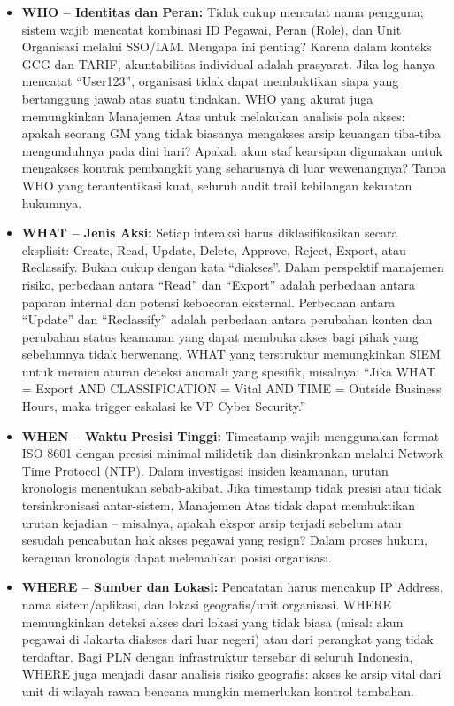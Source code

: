 \documentclass[12pt,a4paper]{report}
\begin{document}
\begin{itemize}[leftmargin=*]
    \item \textbf{WHO -- Identitas dan Peran:} Tidak cukup mencatat nama pengguna; sistem wajib mencatat kombinasi ID Pegawai, Peran (Role), dan Unit Organisasi melalui SSO/IAM. Mengapa ini penting? Karena dalam konteks GCG dan TARIF, akuntabilitas individual adalah prasyarat. Jika log hanya mencatat ``User123'', organisasi tidak dapat membuktikan siapa yang bertanggung jawab atas suatu tindakan. WHO yang akurat juga memungkinkan Manajemen Atas untuk melakukan analisis pola akses: apakah seorang GM yang tidak biasanya mengakses arsip keuangan tiba-tiba mengunduhnya pada dini hari? Apakah akun staf kearsipan digunakan untuk mengakses kontrak pembangkit yang seharusnya di luar wewenangnya? Tanpa WHO yang terautentikasi kuat, seluruh audit trail kehilangan kekuatan hukumnya.

    \item \textbf{WHAT -- Jenis Aksi:} Setiap interaksi harus diklasifikasikan secara eksplisit: Create, Read, Update, Delete, Approve, Reject, Export, atau Reclassify. Bukan cukup dengan kata ``diakses''. Dalam perspektif manajemen risiko, perbedaan antara ``Read'' dan ``Export'' adalah perbedaan antara paparan internal dan potensi kebocoran eksternal. Perbedaan antara ``Update'' dan ``Reclassify'' adalah perbedaan antara perubahan konten dan perubahan status keamanan yang dapat membuka akses bagi pihak yang sebelumnya tidak berwenang. WHAT yang terstruktur memungkinkan SIEM untuk memicu aturan deteksi anomali yang spesifik, misalnya: ``Jika WHAT = Export AND CLASSIFICATION = Vital AND TIME = Outside Business Hours, maka trigger eskalasi ke VP Cyber Security.''

    \item \textbf{WHEN -- Waktu Presisi Tinggi:} Timestamp wajib menggunakan format ISO 8601 dengan presisi minimal milidetik dan disinkronkan melalui Network Time Protocol (NTP). Dalam investigasi insiden keamanan, urutan kronologis menentukan sebab-akibat. Jika timestamp tidak presisi atau tidak tersinkronisasi antar-sistem, Manajemen Atas tidak dapat membuktikan urutan kejadian -- misalnya, apakah ekspor arsip terjadi sebelum atau sesudah pencabutan hak akses pegawai yang resign? Dalam proses hukum, keraguan kronologis dapat melemahkan posisi organisasi.

    \item \textbf{WHERE -- Sumber dan Lokasi:} Pencatatan harus mencakup IP Address, nama sistem/aplikasi, dan lokasi geografis/unit organisasi. WHERE memungkinkan deteksi akses dari lokasi yang tidak biasa (misal: akun pegawai di Jakarta diakses dari luar negeri) atau dari perangkat yang tidak terdaftar. Bagi PLN dengan infrastruktur tersebar di seluruh Indonesia, WHERE juga menjadi dasar analisis risiko geografis: akses ke arsip vital dari unit di wilayah rawan bencana mungkin memerlukan kontrol tambahan.
\end{itemize}
\end{document}
